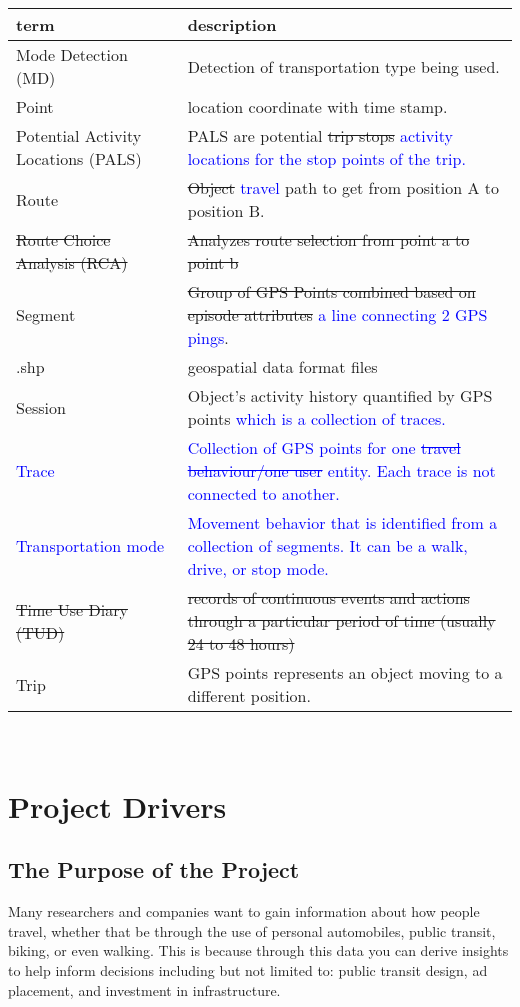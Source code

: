 \documentclass[12pt, titlepage]{article}
\begin{document}
  \begin{tabular}{l p{6cm}}
  \toprule		
  \textbf{term} & \textbf{description}\\
  \midrule
  Mode Detection (MD) & Detection of transportation type being used. \\
  Point & location coordinate with time stamp.\\
  Potential Activity Locations (PALS) & PALS are potential \sout{trip stops} \textcolor{blue}{activity locations for the stop points of the trip.} \\
  Route & \sout{Object} \textcolor{blue}{travel} path to get from position A to position B.\\
  \sout{Route Choice Analysis (RCA)} & \sout{Analyzes route selection from point a to point b}\\
  Segment & \sout{Group of GPS Points combined based on episode attributes } \textcolor{blue}{a line connecting 2 GPS pings}.\\
  .shp & geospatial data format files\\
  Session & Object's activity history quantified by GPS points \textcolor{blue}{which is a collection of traces.} \\
  \textcolor{blue}{Trace} & \textcolor{blue}{Collection of GPS points for one \sout{travel behaviour/one user} entity. Each trace is not connected to another.}\\
  \textcolor{blue}{Transportation mode} & \textcolor{blue}{Movement behavior that is identified from a collection of segments. It can be a walk, drive, or stop mode.}\\
  \sout{Time Use Diary (TUD)} & \sout{records of continuous events and actions through a particular period of time (usually 24 to 48 hours)}\\
  Trip & GPS points represents an object moving to a different position.\\
  \bottomrule
\end{tabular}\\


\section{Project Drivers}

\subsection{The Purpose of the Project}
Many researchers and companies want to gain information about how people travel, whether that be through the use of personal automobiles, public transit, biking, or even walking. This is because through this data you can derive insights to help inform decisions including but not limited to: public transit design, ad placement, and investment in infrastructure. \\
\end{document}
